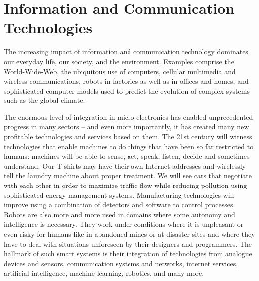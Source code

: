 \section{Information and Communication Technologies}

The increasing impact of information and communication technology dominates our everyday
life, our society, and the environment.  Examples comprise the World-Wide-Web, the
ubiquitous use of computers, cellular multimedia and wireless communications, robots in
factories as well as in offices and homes, and sophisticated computer models used to
predict the evolution of complex systems such as the global climate.

The enormous level of integration in micro-electronics has enabled unprecedented progress
in many sectors -- and even more importantly, it has created many new profitable
technologies and services based on them. The 21st century will witness technologies that
enable machines to do things that have been so far restricted to humans: machines will be
able to sense, act, speak, listen, decide and sometimes understand. Our T-shirts may have
their own Internet addresses and wirelessly tell the laundry machine about proper
treatment. We will see cars that negotiate with each other in order to maximize traffic
flow while reducing pollution using sophisticated energy management systems. Manufacturing
technologies will improve using a combination of detectors and software to control
processes. Robots are also more and more used in domains where some autonomy and
intelligence is necessary. They work under conditions where it is unpleasant or even risky
for humans like in abandoned mines or at disaster sites and where they have to deal with
situations unforeseen by their designers and programmers. The hallmark of such smart
systems is their integration of technologies from analogue devices and sensors,
communication systems and networks, internet services, artificial intelligence, machine
learning, robotics, and many more.

